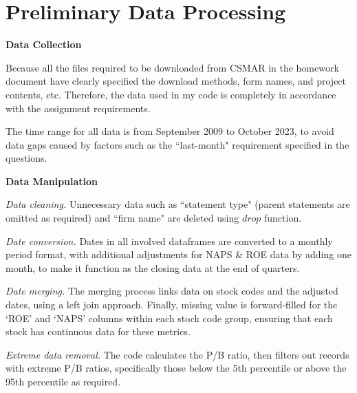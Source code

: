\noindent
\section*{Preliminary Data Processing}

\noindent
\textbf{Data Collection}

Because all the files required to be downloaded from CSMAR in the homework document have clearly specified the download methods, form names, and project contents, etc. Therefore, the data used in my code is completely in accordance with the assignment requirements.


The time range for all data is from September 2009 to October 2023, to avoid data gaps caused by factors such as the ``last-month" requirement specified in the questions.


\noindent
\textbf{Data Manipulation}

\textit{Data cleaning.} Unnecessary data such as ``statement type" (parent statements are omitted as required) and ``firm name" are deleted using $drop$ function. 


\textit{Date conversion.} Dates in all involved dataframes are converted to a monthly period format, with additional adjustments for NAPS \& ROE data by adding one month, to make it function as the closing data at the end of quarters. 

\textit{Date merging.} The merging process links data on stock codes and the adjusted dates, using a left join approach. Finally, missing value is forward-filled for the `ROE' and `NAPS' columns within each stock code group, ensuring that each stock has continuous data for these metrics.


\textit{Extreme data removal.} The code calculates the P/B ratio, then filters out records with extreme P/B ratios, specifically those below the 5th percentile or above the 95th percentile as required.
